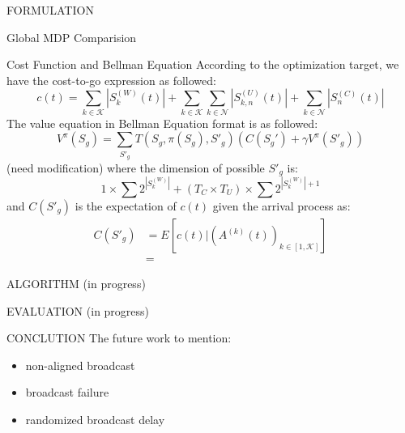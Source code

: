 \documentclass[10pt, conference, letterpaper]{IEEEtran}
\begin{document}
\begin{section}{FORMULATION}
\begin{subsection}{Global MDP Comparision}
            \begin{subsubsection}{Cost Function and Bellman Equation}
                According to the optimization target, we have the cost-to-go expression as followed:
                $$
                c(t) = \sum_{k \in \mathcal{K}}{|S^{(W)}_{k}(t)|}
                        + \sum_{k \in \mathcal{K}}\sum_{k \in \mathcal{N}}{|S^{(U)}_{k,n}(t)|}
                        + \sum_{k \in \mathcal{N}}{|S^{(C)}_{n}(t)|}
                $$
                The value equation in Bellman Equation format is as followed:
                $$
                V^{\pi}(S_g) = \sum_{S'_g} T(S_g, \pi(S_g), S'_g) (C(S_g') + \gamma V^{\pi}(S'_g))
                $$
                (need modification) where the dimension of possible $S'_g$ is:
                $$
                1 \times \sum{2^{|S^{(W)}_k|}} + (T_C \times T_U) \times \sum{2^{|S^{(W)}_k|+1}}
                $$
                and $C(S'_g)$ is the expectation of $c(t)$ given the arrival process as:
                \begin{align*}
                    C(S'_g) &= E[c(t)|(A^{(k)}(t))_{k \in [1,\mathcal{K}]}]
                    \\
                    &= 
                \end{align*}
            \end{subsubsection}
        \end{subsection}
        
    \end{section}

    \begin{section}{ALGORITHM}
        \label{sec:algorithm}
        (in progress)
    \end{section}

    \begin{section}{EVALUATION}
        \label{sec:evaluation}
        (in progress)
    \end{section}

    \begin{section}{CONCLUTION}
        \label{sec:conclusion}
        The future work to mention:
        \begin{itemize}
            \item non-aligned broadcast
            \item broadcast failure
            \item randomized broadcast delay
        \end{itemize}
    \end{section}

    
    
\end{document}
